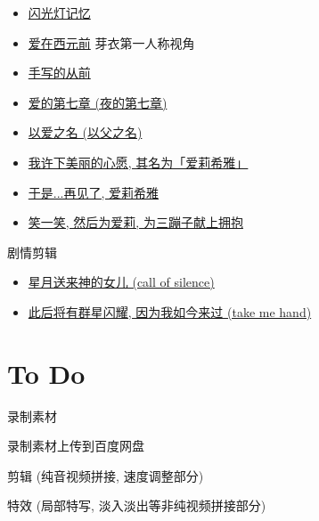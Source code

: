 \documentclass[a4paper]{article}
\begin{document}
\begin{itemize}
    \item \href{https://www.bilibili.com/video/BV1HppJeuEis/}{闪光灯记忆}
    \item \href{https://www.bilibili.com/video/BV1 qN411g71m/}{爱在西元前} 芽衣第一人称视角
    \item \href{https://www.bilibili.com/video/BV1PV4y1x7CD/}{手写的从前}
    \item \href{https://www.bilibili.com/video/BV1dr4y177gy/}{爱的第七章 (夜的第七章)}
    \item \href{https://www.bilibili.com/video/BV1Yr4y1q7Pt/}{以爱之名 (以父之名)}
    \item \href{https://www.bilibili.com/video/BV1BF411w7fD/}{我许下美丽的心愿, 其名为「爱莉希雅」}
    \item \href{https://www.bilibili.com/video/BV1Cr4y1573W/}{于是...再见了, 爱莉希雅}
    \item \href{https://www.bilibili.com/video/BV1WN4y1L745/}{笑一笑, 然后为爱莉, 为三蹦子献上拥抱}
\end{itemize}

剧情剪辑

\begin{itemize}
    \item \href{https://www.bilibili.com/video/BV1ZT4y1s7Zd/}{星月送来神的女儿 (call of silence)}
    \item \href{https://www.bilibili.com/video/BV1Sm41167aK/}{此后将有群星闪耀, 因为我如今来过 (take me hand)}
\end{itemize}

\section{To Do}

录制素材

录制素材上传到百度网盘

剪辑 (纯音视频拼接, 速度调整部分)

特效 (局部特写, 淡入淡出等非纯视频拼接部分)
\end{document}
